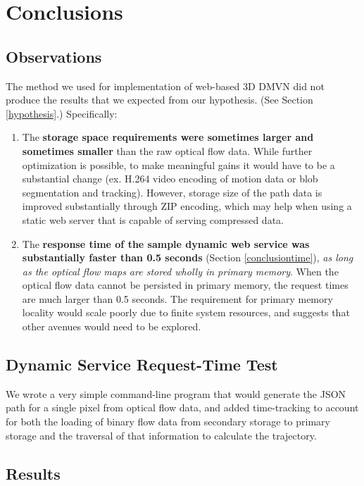 \chapter{Conclusions}

\section{Observations}
The method we used for implementation of web-based 3D DMVN did not produce the results that we expected from our hypothesis. (See Section \ref{hypothesis}.) Specifically:
\begin{enumerate}
\item The \textbf{storage space requirements were sometimes larger and sometimes smaller} than the raw optical flow data. While further optimization is possible, to make meaningful gains it would have to be a substantial change (ex. H.264 video encoding of motion data or blob segmentation and tracking). However, storage size of the path data is improved substantially through ZIP encoding, which may help when using a static web server that is capable of serving compressed data.
\item The \textbf{response time of the sample dynamic web service was substantially faster than 0.5 seconds} (Section \ref{conclusiontime}), \emph{as long as the optical flow maps are stored wholly in primary memory}. When the optical flow data cannot be persisted in primary memory, the request times are much larger than 0.5 seconds. The requirement for primary memory locality would scale poorly due to finite system resources, and suggests that other avenues would need to be explored.
\end{enumerate}

\section{Dynamic Service Request-Time Test}
We wrote a very simple command-line program that would generate the JSON path for a single pixel from optical flow data, and added time-tracking to account for both the loading of binary flow data from secondary storage to primary storage and the traversal of that information to calculate the trajectory.

\section{Results}

